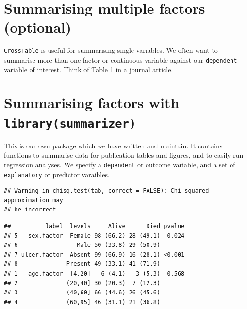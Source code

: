 \documentclass[]{book}
\makeatletter
\newenvironment{Shaded}{\begin{snugshade}}{\end{snugshade}}
\newcommand{\DataTypeTok}[1]{\textcolor[rgb]{0.13,0.29,0.53}{#1}}
\newcommand{\KeywordTok}[1]{\textcolor[rgb]{0.13,0.29,0.53}{\textbf{#1}}}
\newcommand{\NormalTok}[1]{#1}
\newcommand{\OperatorTok}[1]{\textcolor[rgb]{0.81,0.36,0.00}{\textbf{#1}}}
\newcommand{\OtherTok}[1]{\textcolor[rgb]{0.56,0.35,0.01}{#1}}
\newcommand{\StringTok}[1]{\textcolor[rgb]{0.31,0.60,0.02}{#1}}
\newenvironment{kframe}{%
\medskip{}
\setlength{\fboxsep}{.8em}
 \def\at@end@of@kframe{}%
 \ifinner\ifhmode%
  \def\at@end@of@kframe{\end{minipage}}%
  \begin{minipage}{\columnwidth}%
 \fi\fi%
 \def\FrameCommand##1{\hskip\@totalleftmargin \hskip-\fboxsep
 \colorbox{shadecolor}{##1}\hskip-\fboxsep
     \hskip-\linewidth \hskip-\@totalleftmargin \hskip\columnwidth}%
 \MakeFramed {\advance\hsize-\width
   \@totalleftmargin\z@ \linewidth\hsize
   \@setminipage}}%
 {\par\unskip\endMakeFramed%
 \at@end@of@kframe}
\renewenvironment{Shaded}{\begin{kframe}}{\end{kframe}}
\theoremstyle{definition}
\theoremstyle{definition}
\theoremstyle{definition}
\theoremstyle{remark}
\makeatother
\begin{document}
\hypertarget{summarising-multiple-factors-optional}{%
\section{Summarising multiple factors
(optional)}\label{summarising-multiple-factors-optional}}

\texttt{CrossTable} is useful for summarising single variables. We often
want to summarise more than one factor or continuous variable against
our \texttt{dependent} variable of interest. Think of Table 1 in a
journal article.

\hypertarget{summarising-factors-with-librarysummarizer}{%
\section{\texorpdfstring{Summarising factors with
\texttt{library(summarizer)}}{Summarising factors with library(summarizer)}}\label{summarising-factors-with-librarysummarizer}}

This is our own package which we have written and maintain. It contains
functions to summarise data for publication tables and figures, and to
easily run regression analyses. We specify a \texttt{dependent} or
outcome variable, and a set of \texttt{explanatory} or predictor
varaibles.

\begin{Shaded}
\end{Shaded}

\begin{verbatim}
## Warning in chisq.test(tab, correct = FALSE): Chi-squared approximation may
## be incorrect
\end{verbatim}

\begin{verbatim}
##          label  levels     Alive      Died pvalue
## 5   sex.factor  Female 98 (66.2) 28 (49.1)  0.024
## 6                 Male 50 (33.8) 29 (50.9)       
## 7 ulcer.factor  Absent 99 (66.9) 16 (28.1) <0.001
## 8              Present 49 (33.1) 41 (71.9)       
## 1   age.factor  [4,20]   6 (4.1)   3 (5.3)  0.568
## 2              (20,40] 30 (20.3)  7 (12.3)       
## 3              (40,60] 66 (44.6) 26 (45.6)       
## 4              (60,95] 46 (31.1) 21 (36.8)
\end{verbatim}
\end{document}
